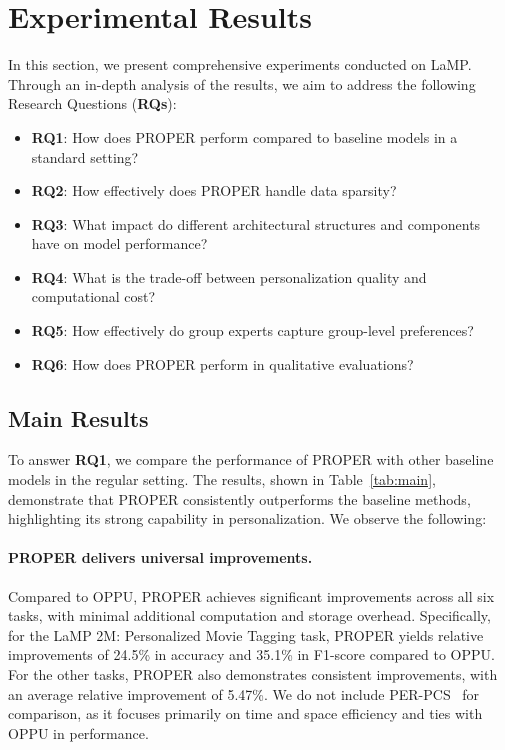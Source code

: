 \documentclass[11pt]{article}
\begin{document}
\section{Experimental Results}
In this section, we present comprehensive experiments conducted on LaMP. 
Through an in-depth analysis of the results, we aim to address the following Research Questions (\textbf{RQs}):
\begin{itemize}
    \item \textbf{RQ1}: How does PROPER perform compared to baseline models in a standard setting?
    \item \textbf{RQ2}: How effectively does PROPER handle data sparsity?
    \item \textbf{RQ3}: What impact do different architectural structures and components have on model performance?
    \item \textbf{RQ4}: What is the trade-off between personalization quality and computational cost?
    \item \textbf{RQ5}: How effectively do group experts capture group-level preferences?
    \item \textbf{RQ6}: How does PROPER perform in qualitative evaluations?
\end{itemize}


\subsection{Main Results}

To answer \textbf{RQ1}, we compare the performance of PROPER with other baseline models in the regular setting. 
The results, shown in Table~\ref{tab:main}, demonstrate that PROPER consistently outperforms the baseline methods, highlighting its strong capability in personalization. 
We observe the following:

\paragraph{PROPER delivers universal improvements.} 
Compared to OPPU, PROPER achieves significant improvements across all six tasks, with minimal additional computation and storage overhead. 
Specifically, for the LaMP 2M: Personalized Movie Tagging task, PROPER yields relative improvements of 24.5\% in accuracy and 35.1\% in F1-score compared to OPPU. 
For the other tasks, PROPER also demonstrates consistent improvements, with an average relative improvement of 5.47\%. 
We do not include PER-PCS~\cite{tan-etal-2024-personalized} for comparison, as it focuses primarily on time and space efficiency and ties with OPPU in performance.
\end{document}
